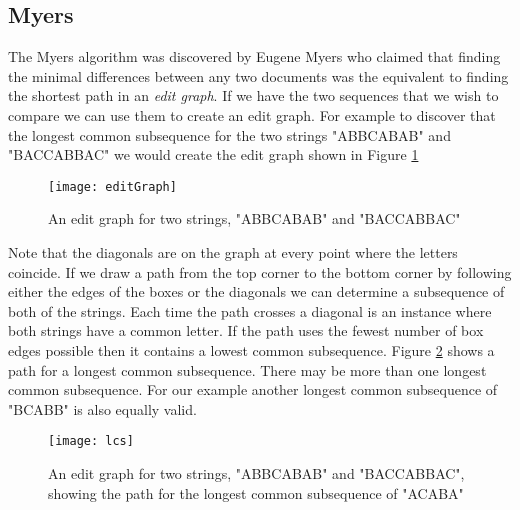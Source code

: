 \subsection{Myers}
The Myers algorithm was discovered by Eugene Myers \cite{Myers1986} who claimed that finding the minimal differences between any two documents was the equivalent to finding the shortest path in an \emph{edit graph}.  
If we have the two sequences that we wish to compare we can use them to create an edit graph. 
For example to discover that the longest common subsequence for the two strings "ABBCABAB" and "BACCABBAC" we would create the edit graph shown in Figure \ref{fig:editGraph}

\begin{figure}[!t]
 \begin{center}
 \texttt{[image: editGraph]}
 \end{center}
 \caption{An edit graph for two strings, "ABBCABAB" and "BACCABBAC"}
 \label{fig:editGraph}
\end{figure} 

Note that the diagonals are on the graph at every point where the letters coincide.
If we draw a path from the top corner to the bottom corner by following either the edges of the boxes or the diagonals we can determine a subsequence of both of the strings.
Each time the path crosses a diagonal is an instance where both strings have a common letter.
If the path uses the fewest number of box edges possible then it contains a lowest common subsequence.
Figure \ref{fig:lcs} shows a path for a longest common subsequence.
There may be more than one longest common subsequence.
For our example another longest common subsequence of "BCABB" is also equally valid.



\begin{figure}[!t]
 \begin{center}
 \texttt{[image: lcs]}
 \end{center}
 \caption{An edit graph for two strings, "ABBCABAB" and "BACCABBAC", showing the path for the longest common subsequence of "ACABA"}
 \label{fig:lcs}
\end{figure}



